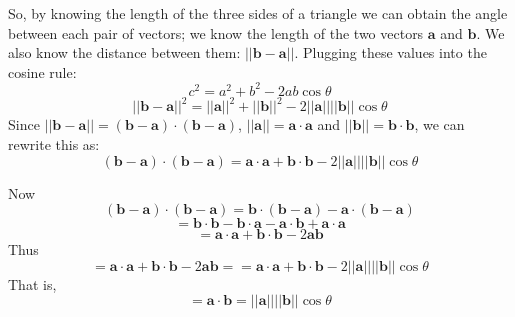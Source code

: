 \documentclass{beamer}
\begin{document}
\begin{frame}
So, by knowing the length of the three sides of a triangle we can obtain the angle between each pair of vectors; we know the length of the two vectors $\mathbf{a}$ and  $\mathbf{b}$. We also know the distance between them: 
$||\mathbf{b}-\mathbf{a}||$.  Plugging these values into the cosine rule:
$$ c^2 = a^2 + b^2 - 2ab\cos{\theta}$$
$$ ||\mathbf{b}-\mathbf{a}||^2 = ||\mathbf{a}||^2 + ||\mathbf{b}||^2  - 2||\mathbf{a}||||\mathbf{b}||\cos{\theta}$$
Since $||\mathbf{b}-\mathbf{a}||  = \left( \mathbf{b}-\mathbf{a} \right) \cdot  \left( \mathbf{b}-\mathbf{a} \right)$, 
 $||\mathbf{a}||  = \mathbf{a} \cdot   \mathbf{a}$ and 
 $||\mathbf{b}||  = \mathbf{b} \cdot   \mathbf{b}$, we can rewrite this as:
 $$\left( \mathbf{b}-\mathbf{a} \right) \cdot  \left( \mathbf{b}-\mathbf{a} \right) = \mathbf{a} \cdot   \mathbf{a} + \mathbf{b} \cdot   \mathbf{b} - 
 2  ||\mathbf{a}||  ||\mathbf{b}|| \cos \theta$$
 
\end{frame}
\begin{frame}


Now 
$$\left( \mathbf{b}-\mathbf{a} \right) \cdot  \left( \mathbf{b}-\mathbf{a} \right)  = \mathbf{b} \cdot \left( \mathbf{b}-\mathbf{a} \right) - \mathbf{a} \cdot \left( \mathbf{b}-\mathbf{a} \right)$$
$$ = \mathbf{b} \cdot \mathbf{b} - \mathbf{b} \cdot \mathbf{a} - \mathbf{a} \cdot \mathbf{b} + \mathbf{a} \cdot \mathbf{a} $$
$$ = \mathbf{a} \cdot \mathbf{a} + \mathbf{b} \cdot \mathbf{b} - 2 \mathbf{a} \mathbf{b} $$
Thus
$$ = \mathbf{a} \cdot \mathbf{a} + \mathbf{b} \cdot \mathbf{b} - 2 \mathbf{a} \mathbf{b}  = = \mathbf{a} \cdot \mathbf{a} + \mathbf{b} \cdot \mathbf{b}  - 2 ||\mathbf{a}||  ||\mathbf{b}|| \cos \theta $$
That is,
$$ = \mathbf{a} \cdot \mathbf{b} =  ||\mathbf{a}||  ||\mathbf{b}|| \cos \theta$$

\end{frame}
\end{document}
